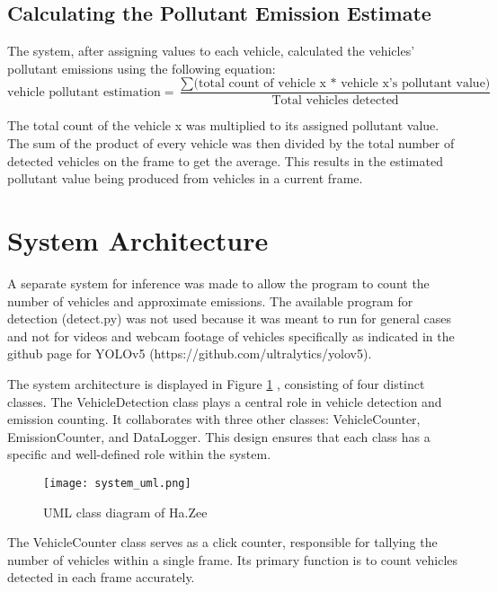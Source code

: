 \subsection{Calculating the Pollutant Emission Estimate}

The system, after assigning values to each vehicle, calculated the vehicles’ pollutant emissions using the following equation:
\begin{equation}
\text{vehicle pollutant estimation} = \frac{\sum\text{(total count of vehicle x * vehicle x's pollutant value)}}{\text{Total vehicles detected}}
\end{equation}

The total count of the vehicle x was multiplied to its assigned pollutant value. The sum of the product of every vehicle was then divided by the total number of detected vehicles on the frame to get the average. This results in the estimated pollutant value being produced from vehicles in a current frame.


\section{System Architecture}

A separate system for inference was made to allow the program to count the number of vehicles and approximate emissions. The available program for detection (detect.py) was not used because it was meant to run for general cases and not for videos and webcam footage of vehicles specifically as indicated in the github page for YOLOv5 (https://github.com/ultralytics/yolov5). 

The system architecture is displayed in Figure \ref{fig:system_uml} , consisting of four distinct classes. The VehicleDetection class plays a central role in vehicle detection and emission counting. It collaborates with three other classes: VehicleCounter, EmissionCounter, and DataLogger. This design ensures that each class has a specific and well-defined role within the system.

\begin{figure}[!htbp]
	\texttt{[image: system\_uml.png]}
	\caption{UML class diagram of Ha.Zee}
	\label{fig:system_uml}
\end{figure}
\FloatBarrier

The VehicleCounter class serves as a click counter, responsible for tallying the number of vehicles within a single frame. Its primary function is to count vehicles detected in each frame accurately.

